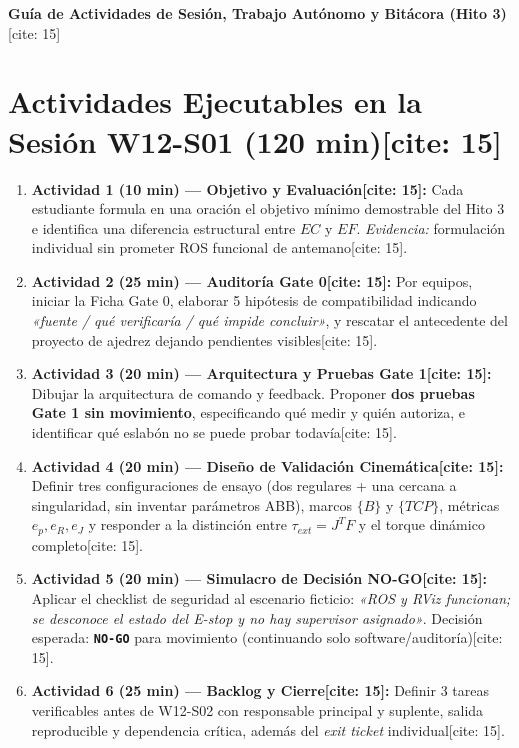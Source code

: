 \documentclass[11pt, a4paper]{article}
\begin{document}
\begin{center}
    \Large\textbf{\textcolor{ucbblue}{Guía de Actividades de Sesión, Trabajo Autónomo y Bitácora (Hito 3)}}[cite: 15]
\end{center}

\section{Actividades Ejecutables en la Sesión W12-S01 (120 min)[cite: 15]}
\begin{enumerate}
    \item \textbf{Actividad 1 (10 min) — Objetivo y Evaluación[cite: 15]:} Cada estudiante formula en una oración el objetivo mínimo demostrable del Hito 3 e identifica una diferencia estructural entre $EC$ y $EF$. \textit{Evidencia:} formulación individual sin prometer ROS funcional de antemano[cite: 15].
    \item \textbf{Actividad 2 (25 min) — Auditoría Gate 0[cite: 15]:} Por equipos, iniciar la Ficha Gate 0, elaborar 5 hipótesis de compatibilidad indicando \textit{«fuente / qué verificaría / qué impide concluir»}, y rescatar el antecedente del proyecto de ajedrez dejando pendientes visibles[cite: 15].
    \item \textbf{Actividad 3 (20 min) — Arquitectura y Pruebas Gate 1[cite: 15]:} Dibujar la arquitectura de comando y feedback. Proponer \textbf{dos pruebas Gate 1 sin movimiento}, especificando qué medir y quién autoriza, e identificar qué eslabón no se puede probar todavía[cite: 15].
    \item \textbf{Actividad 4 (20 min) — Diseño de Validación Cinemática[cite: 15]:} Definir tres configuraciones de ensayo (dos regulares + una cercana a singularidad, sin inventar parámetros ABB), marcos $\{B\}$ y $\{TCP\}$, métricas $e_p, e_R, e_J$ y responder a la distinción entre $\tau_{ext}=J^T F$ y el torque dinámico completo[cite: 15].
    \item \textbf{Actividad 5 (20 min) — Simulacro de Decisión NO-GO[cite: 15]:} Aplicar el checklist de seguridad al escenario ficticio: \textit{«ROS y RViz funcionan; se desconoce el estado del E-stop y no hay supervisor asignado»}. Decisión esperada: \textbf{\texttt{NO-GO}} para movimiento (continuando solo software/auditoría)[cite: 15].
    \item \textbf{Actividad 6 (25 min) — Backlog y Cierre[cite: 15]:} Definir 3 tareas verificables antes de W12-S02 con responsable principal y suplente, salida reproducible y dependencia crítica, además del \textit{exit ticket} individual[cite: 15].
\end{enumerate}
\end{document}
